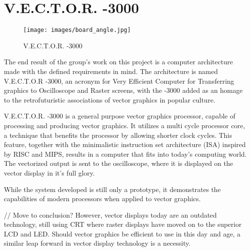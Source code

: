 \chapter{V.E.C.T.O.R. -3000}

\begin{figure}[H]
    \centering \texttt{[image: images/board\_angle.jpg]}
    \caption{V.E.C.T.O.R. -3000}
    \label{fig:board-angle}
\end{figure}

The end result of the group's work on this project is a computer architecture made with the defined requirements in mind.
The architecture is named V.E.C.T.O.R -3000, an acronym for Very Efficient Computer for Transferring graphics to Oscilloscope and Raster screens, with the -3000 added as an homage to the retrofuturistic associations of vector graphics in popular culture.

V.E.C.T.O.R. -3000 is a general purpose vector graphics processor, capable of processing and producing vector graphics. 
It utilizes a multi cycle processor core, a technique that benefits the processor by allowing shorter clock cycles.
This feature, together with the minimalistic instruction set architecture (ISA) inspired by RISC\cite{risc} and MIPS\cite{mips}, results in a computer that fits into today's computing world.
The vectorized output is sent to the oscilloscope, where it is displayed on the vector display in it's full glory.

While the system developed is still only a prototype, it demonstrates the capabilities of modern processors when applied to vector graphics. 


// Move to conclusion?
However, vector displays today are an outdated technology, still using CRT where raster displays have moved on to the superior LCD and LED.
Should vector graphics be efficient to use in this day and age, a similar leap forward in vector display technology is a necessity.